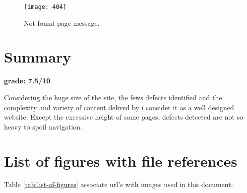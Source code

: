 \documentclass[
10pt, %
a4paper, %
oneside, %
headinclude,footinclude, %
BCOR5mm, %
]{scrartcl}
\begin{document}
	\begin{figure}[h]
	\centering 
	\centerline{\texttt{[image: 404]}}
	\caption[Not found page]{Not found page message.}
	\label{fig:not-found-page} 
	\end{figure}


\clearpage
\section{Summary}
	\begin{centering}
	{ \huge \bfseries grade: 7.5/10 \\[0.3cm] }
	\end{centering}
	Considering the huge size of the site, the fews defects identified and the complexity and variety of content delived by \thesite{} i consider it as a well designed website. Except the excessive height of some pages, defects detected are not so heavy to spoil navigation.



\section{List of figures with file references}
Table \ref{tab:list-of-figures} associate url's with images used in this document:
\end{document}
